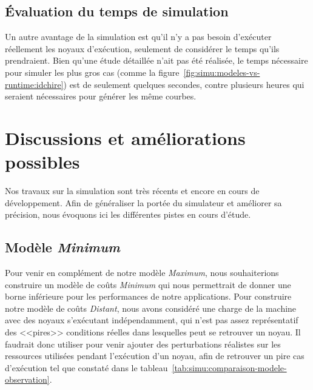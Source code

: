 \subsection*{Évaluation du temps de simulation}

Un autre avantage de la simulation est qu'il n'y a pas besoin d'exécuter réellement les noyaux d'exécution, seulement de considérer le temps qu'ils prendraient.
Bien qu'une étude détaillée n'ait pas été réalisée, le temps nécessaire pour simuler les plus gros cas (comme la figure~\ref{fig:simu:modeles-vs-runtime:idchire}) est de seulement quelques secondes, contre plusieurs heures qui seraient nécessaires pour générer les même courbes.







\section{Discussions et améliorations possibles}\label{sec:simulation:next}

Nos travaux sur la simulation sont très récents et encore en cours de développement.
Afin de généraliser la portée du simulateur et améliorer sa précision, nous évoquons ici les différentes pistes en cours d'étude.

\subsection{Modèle \emph{Minimum}}

Pour venir en complément de notre modèle \emph{Maximum}, nous souhaiterions construire un modèle de coûts \emph{Minimum} qui nous permettrait de donner une borne inférieure pour les performances de notre applications.
Pour construire notre modèle de coûts \emph{Distant}, nous avons considéré une charge de la machine avec des noyaux s'exécutant indépendamment, qui n'est pas assez représentatif des <<pires>> conditions réelles dans lesquelles peut se retrouver un noyau.
Il faudrait donc utiliser \outil pour venir ajouter des perturbations réalistes sur les ressources utilisées pendant l'exécution d'un noyau, afin de retrouver un pire cas d'exécution tel que constaté dans le tableau~\ref{tab:simu:comparaison-modele-observation}.

